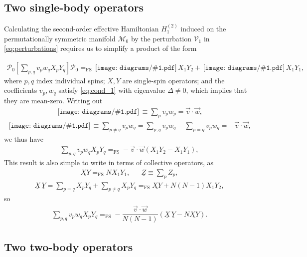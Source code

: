 \documentclass[nofootinbib,notitlepage,11pt]{revtex4-2}
\newcommand{\f}[2]{\dfrac{#1}{#2}} %
\newcommand{\p}[1]{\left(#1\right)} %
\renewcommand{\sp}[1]{\left[#1\right]} %
\renewcommand{\c}{\cdot} %
\renewcommand{\v}{\vec} %
\newcommand{\1}{\mathds{1}}
\newcommand{\M}{\mathcal{M}}
\renewcommand{\P}{\mathcal{P}}
\newcommand{\V}{\mathcal{V}}
\newcommand{\EQFS}{=_{\text{FS}}}
\newcommand{\col}{\underline}
\newcommand{\diagram}[1]
{\,\texttt{[image: diagrams/\#1.pdf]}\,}
\begin{document}
\subsection{Two single-body operators}
\label{sec:PXYP}

Calculating the second-order effective Hamiltonian $H_1^{(2)}$ induced
on the permutationally symmetric manifold $\M_0$ by the perturbation
$\V_1$ in \eqref{eq:perturbations} requires us to simplify a product
of the form

\begin{align}
  \P_0 \sp{\sum_{p,q} v_p w_q X_p Y_q} \P_0
  \EQFS \diagram{single_body_0} X_1 Y_2
  + \diagram{single_body_1} X_1 Y_1,
  \label{eq:PXYP_start}
\end{align}
where $p,q$ index individual spins; $X,Y$ are single-spin operators;
and the coefficients $v_p,w_q$ satisfy \eqref{eq:cond_1} with
eigenvalue $\Delta\ne0$, which implies that they are mean-zero.
Writing out
\begin{align}
  \diagram{single_body_1}
  \equiv \sum_p v_p w_p
  = \v v\c\v w,
\end{align}
\begin{align}
  \diagram{single_body_0}
  \equiv \sum_{p\ne q} v_p w_q
  = \sum_{p,q} v_p w_q - \sum_{p=q} v_p w_q
  = - \v v \c\v w,
\end{align}
we thus have
\begin{align}
  \sum_{p,q} v_p w_q X_p Y_q
  \EQFS - \v v\c\v w \p{X_1 Y_2 - X_1 Y_1},
\end{align}
This result is also simple to write in terms of collective operators,
as
\begin{align}
  \col{X Y} \EQFS N X_1 Y_1,
  &&
  \col{Z} \equiv \sum_p Z_p,
\end{align}
\begin{align}
  \col{X}\,\col{Y}
  = \sum_{p=q} X_p Y_q + \sum_{p\ne q} X_p Y_q
  \EQFS \col{XY} + N\p{N-1} X_1 Y_2,
\end{align}
so
\begin{align}
  \sum_{p,q} v_p w_q X_p Y_q
  \EQFS - \f{\v v \c\v w}{N\p{N-1}}
  \p{\col{X}\,\col{Y} - N \col{XY}}.
\end{align}

\subsection{Two two-body operators}
\label{sec:POQP}
\end{document}
